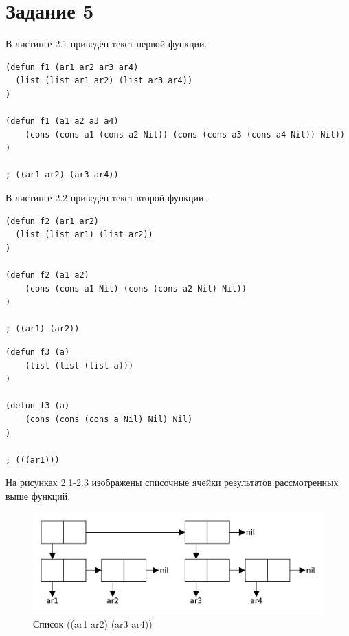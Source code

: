 \section{Задание \No{}5}
В листинге 2.1 приведён текст первой функции.

\lstset{language=lisp}
\begin{lstlisting}[caption={Примеры первой функции}]
(defun f1 (ar1 ar2 ar3 ar4)
  (list (list ar1 ar2) (list ar3 ar4))
)

(defun f1 (a1 a2 a3 a4)
    (cons (cons a1 (cons a2 Nil)) (cons (cons a3 (cons a4 Nil)) Nil))
)

; ((ar1 ar2) (ar3 ar4))
\end{lstlisting}

\par
В листинге 2.2 приведён текст второй функции.


\begin{lstlisting}[caption={Примеры второй функци}]
(defun f2 (ar1 ar2)
  (list (list ar1) (list ar2))
)

(defun f2 (a1 a2)
    (cons (cons a1 Nil) (cons (cons a2 Nil) Nil))
)

; ((ar1) (ar2))
\end{lstlisting}

\begin{lstlisting}[caption={Примеры второй функци}]
(defun f3 (a)
	(list (list (list a)))
)

(defun f3 (a)
    (cons (cons (cons a Nil) Nil) Nil)
)

; (((ar1)))
\end{lstlisting}

На рисунках 2.1-2.3 изображены списочные ячейки результатов рассмотренных выше функций.
\begin{figure}[H]
    \centering
    \includegraphics[scale=0.60]{data/pdf/02-01.pdf}
    \caption{Список ((ar1 ar2) (ar3 ar4))}
\end{figure}


